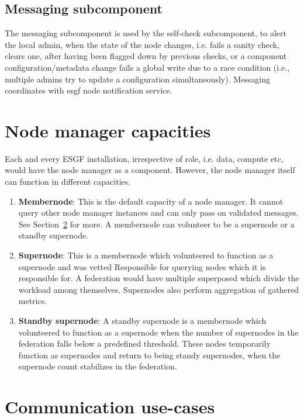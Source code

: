 \documentclass[oneside,12pt]{memoir}
\begin{document}
\subsection{Messaging subcomponent}

The messaging subcomponent is used by the self-check subcomponent, to alert the local admin, when the state of the node changes, i.e. fails a sanity check,  clears one, after having been flagged down by previous checks, or a component configuration/metadata change fails a global write due to a race condition (i.e., multiple admins try to update a configuration simultaneously).  
  Messaging coordinates with esgf node notification service.





\section{Node manager capacities}
Each and every ESGF installation, irrespective of role, i.e. data, compute etc, would have the node manager as a component.  However, the node manager itself can function in different capacities. 
\begin{enumerate}
\item \textbf{Membernode}: This is the default capacity of a node manager. It cannot query other node manager instances and can only pass on validated messages. See Section~\ref{commcases} for more. A membernode can volunteer to be a supernode or a standby supernode.
\item \textbf{Supernode}: This is a membernode which volunteered to function as a supernode and was vetted Responsible for querying nodes which it is responsible for.  A federation would have multiple superposed which divide the workload among themselves. Supernodes also perform aggregation of gathered metrics. 
\item \textbf{Standby supernode}: A standby supernode is a membernode which volunteered to function as a supernode when the number of supernodes in the federation falls below a predefined threshold. These nodes temporarily function as supernodes and return to being standy supernodes, when the supernode count stabilizes in the federation.
\end{enumerate}



\section{Communication use-cases}
\label{commcases}
\end{document}
